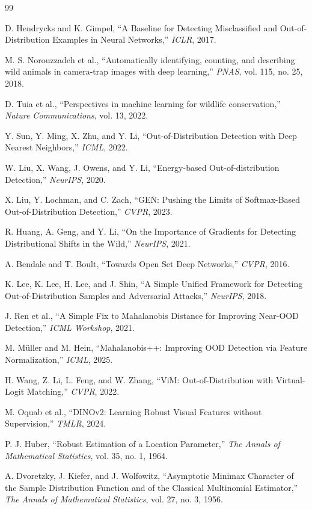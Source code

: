 \documentclass[uplatex,dvipdfmx,a4paper,10pt,twocolumn]{bxjsarticle}
\begin{document}
{\footnotesize
\begin{thebibliography}{99}

D. Hendrycks and K. Gimpel,
``A Baseline for Detecting Misclassified and Out-of-Distribution Examples in Neural Networks,''
\textit{ICLR}, 2017.

M. S. Norouzzadeh et al.,
``Automatically identifying, counting, and describing wild animals in camera-trap images with deep learning,''
\textit{PNAS}, vol. 115, no. 25, 2018.

D. Tuia et al.,
``Perspectives in machine learning for wildlife conservation,''
\textit{Nature Communications}, vol. 13, 2022.

Y. Sun, Y. Ming, X. Zhu, and Y. Li,
``Out-of-Distribution Detection with Deep Nearest Neighbors,''
\textit{ICML}, 2022.

W. Liu, X. Wang, J. Owens, and Y. Li,
``Energy-based Out-of-distribution Detection,''
\textit{NeurIPS}, 2020.

X. Liu, Y. Lochman, and C. Zach,
``GEN: Pushing the Limits of Softmax-Based Out-of-Distribution Detection,''
\textit{CVPR}, 2023.

R. Huang, A. Geng, and Y. Li,
``On the Importance of Gradients for Detecting Distributional Shifts in the Wild,''
\textit{NeurIPS}, 2021.

A. Bendale and T. Boult,
``Towards Open Set Deep Networks,''
\textit{CVPR}, 2016.

K. Lee, K. Lee, H. Lee, and J. Shin,
``A Simple Unified Framework for Detecting Out-of-Distribution Samples and Adversarial Attacks,''
\textit{NeurIPS}, 2018.

J. Ren et al.,
``A Simple Fix to Mahalanobis Distance for Improving Near-OOD Detection,''
\textit{ICML Workshop}, 2021.

M. M\"uller and M. Hein,
``Mahalanobis++: Improving OOD Detection via Feature Normalization,''
\textit{ICML}, 2025.

H. Wang, Z. Li, L. Feng, and W. Zhang,
``ViM: Out-of-Distribution with Virtual-Logit Matching,''
\textit{CVPR}, 2022.

M. Oquab et al.,
``DINOv2: Learning Robust Visual Features without Supervision,''
\textit{TMLR}, 2024.

P. J. Huber,
``Robust Estimation of a Location Parameter,''
\textit{The Annals of Mathematical Statistics}, vol. 35, no. 1, 1964.

A. Dvoretzky, J. Kiefer, and J. Wolfowitz,
``Asymptotic Minimax Character of the Sample Distribution Function and of the Classical Multinomial Estimator,''
\textit{The Annals of Mathematical Statistics}, vol. 27, no. 3, 1956.

\end{thebibliography}
}
\end{document}
